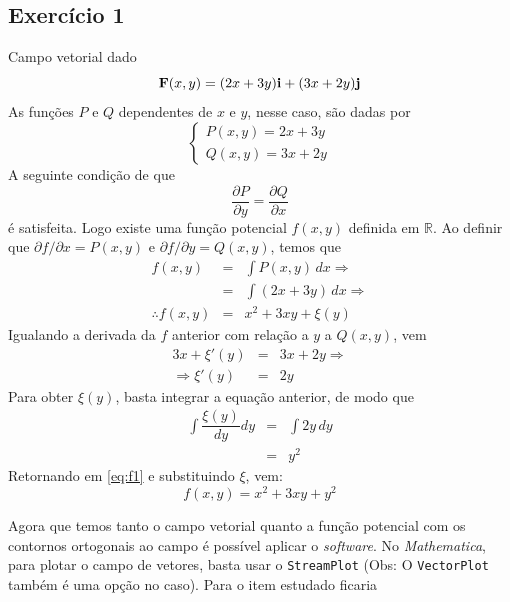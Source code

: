 \documentclass[a4paper, 12pt, brazilian]{article}
\begin{document}
	\subsection{Exercício 1}
	\noindent Campo vetorial dado
	\begin{equation}
		\textbf{F} (x,y)=(2x+3y)\textbf{i}+(3x+2y)\textbf{j}
	\end{equation}
	As funções $P$ e $Q$ dependentes de $x$ e $y$, nesse caso, são dadas por
	$$
		\begin{cases}
			P(x,y)=2x+3y\\	
			Q(x,y)=3x+2y
		\end{cases}
	$$
	A seguinte condição de que
	\begin{equation}
		\dfrac{\partial P}{\partial y}=\dfrac{\partial Q}{\partial x}
	\end{equation}
	é satisfeita. Logo existe uma função potencial $f(x,y)$ definida em $\mathbb{R}$. Ao definir que $\partial f/\partial x=P(x,y)$ e $\partial f/\partial y=Q(x,y)$, temos que
	\begin{eqnarray}
		f(x,y)&=&\int P(x,y)\,dx\Rightarrow\\
		&=&\int(2x+3y)\,dx\Rightarrow\\
		\therefore f(x,y)&=&x^{2}+3xy+\xi(y)\label{eq:f1}
	\end{eqnarray}
	Igualando a derivada da $f$ anterior com relação a $y$ a $Q(x,y)$, vem
	\begin{eqnarray}
		3x+\xi'(y)&=&3x+2y\Rightarrow\\
		\Rightarrow\xi'(y)&=&2y
	\end{eqnarray}
	Para obter $\xi(y)$, basta integrar a equação anterior, de modo que
	\begin{eqnarray}
		\int\dfrac{\xi(y)}{dy}dy&=&\int 2y\,dy\\
		&=&y^{2}
	\end{eqnarray}
	Retornando em \eqref{eq:f1} e substituindo $\xi$, vem:
	\begin{equation}
		f(x,y)=x^{2}+3xy+y^{2}
	\end{equation}
	
	Agora que temos tanto o campo vetorial quanto a função potencial com os contornos ortogonais ao campo é possível aplicar o \textit{software}. No \textit{Mathematica}, para plotar o campo de vetores, basta usar o \texttt{StreamPlot} (Obs: O \texttt{VectorPlot} também é uma opção no caso). Para o item estudado ficaria
	
\end{document}
